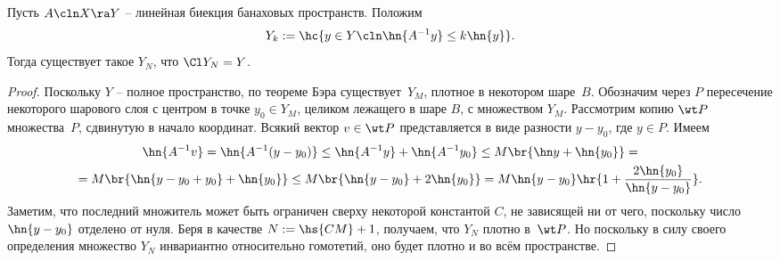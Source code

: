 \documentclass[a4paper]{article}
\begin{document}
\begin{lemma}
Пусть $A\cln X \ra Y$ -- линейная биекция банаховых пространств.
Положим
$$Y_k := \hc{y \in Y\cln \hn{A^{-1}y} \le k\hn{y}}.$$
Тогда существует такое $Y_N$, что $\Cl Y_N = Y$.
\end{lemma}
\begin{proof}
Поскольку $Y$ -- полное пространство, по теореме Бэра существует~$Y_M$, плотное в некотором шаре~$B$.
Обозначим через $P$ пересечение некоторого шарового слоя с центром в точке $y_0 \in Y_M$, целиком лежащего
в шаре $B$, с множеством $Y_M$. Рассмотрим копию $\wt P$ множества~$P$, сдвинутую в начало координат.
Всякий вектор $v \in \wt P$ представляется в виде разности $y - y_0$, где $y \in P$.
Имеем
\begin{multline*}
\hn{A^{-1}v} = \hn{A^{-1}(y-y_0)} \le \hn{A^{-1}y} + \hn{A^{-1}y_0} \le M\br{\hn y + \hn{y_0}} =\\=
M\br{\hn{y - y_0 + y_0} + \hn{y_0} } \le M\br{\hn{y -y_0} + 2\hn{y_0}} = M\hn{y-y_0}\hr{1 + \frac{2\hn{y_0}}{\hn{y-y_0}}}.
\end{multline*}
Заметим, что последний множитель может быть ограничен сверху некоторой константой $C$,
не зависящей ни от чего, поскольку число $\hn{y-y_0}$ отделено от нуля. Беря
в качестве $N := \hs{CM} + 1$, получаем, что $Y_N$ плотно в~$\wt P$. Но поскольку
в силу своего определения множество $Y_N$ инвариантно относительно
гомотетий, оно будет плотно и во всём пространстве.
\end{proof}
\end{document}
